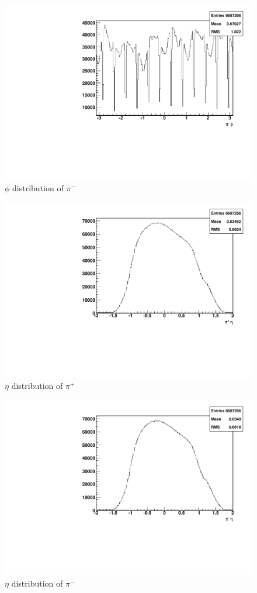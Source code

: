 \documentclass[letterpaper, abstract = on,listof=totoc, bibliography=totoc]{scrreprt}
\begin{document}
\begin{figure}
\begin{center}
\includegraphics[width = .8\textwidth]{hNegPhi}
\caption[$\phi$ distribution of $\pi^-$]{$\phi$ distribution of $\pi^-$}
\label{fig:negphi}
\end{center}
\end{figure}

\begin{figure}
\begin{center}
\includegraphics[width = .8\textwidth]{hPosEta}
\caption[$\eta$ distribution of $\pi^+$]{$\eta$ distribution of $\pi^+$}
\label{fig:poseta}
\end{center}
\end{figure}

\begin{figure}
\begin{center}
\includegraphics[width = .8\textwidth]{hNegEta}
\caption[$\eta$ distribution of $\pi^-$]{$\eta$ distribution of $\pi^-$}
\label{fig:negeta}
\end{center}
\end{figure}
\end{document}
